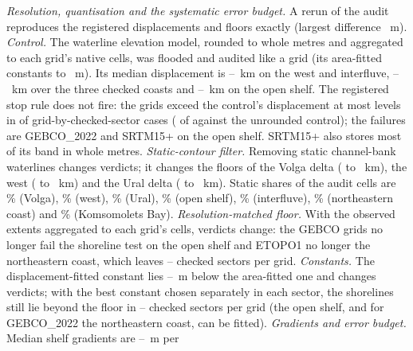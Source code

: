\emph{Resolution, quantisation and the systematic error budget.} A rerun of the audit reproduces the registered displacements and floors exactly (largest difference ~m). \emph{Control.} The waterline elevation model, rounded to whole metres and aggregated to each grid's native cells, was flooded and audited like a grid (its area-fitted constants  to ~m). Its median displacement is --~km on the west and interfluve, --~km over the three checked coasts and --~km on the open shelf. The registered stop rule does not fire: the grids exceed the control's displacement at most levels in  of  grid-by-checked-sector cases ( of  against the unrounded control); the  failures are GEBCO\_2022 and SRTM15+ on the open shelf. SRTM15+ also stores most of its band in whole metres. \emph{Static-contour filter.} Removing static channel-bank waterlines changes  verdicts; it changes the floors of the Volga delta ( to ~km), the west ( to ~km) and the Ural delta ( to ~km). Static shares of the audit cells are \% (Volga), \% (west), \% (Ural), \% (open shelf), \% (interfluve), \% (northeastern coast) and \% (Komsomolets Bay). \emph{Resolution-matched floor.} With the observed extents aggregated to each grid's cells,  verdicts change: the GEBCO grids no longer fail the shoreline test on the open shelf and ETOPO1 no longer the northeastern coast, which leaves -- checked sectors per grid. \emph{Constants.} The displacement-fitted constant lies --~m below the area-fitted one and changes  verdicts; with the best constant chosen separately in each sector, the shorelines still lie beyond the floor in -- checked sectors per grid (the open shelf, and for GEBCO\_2022 the northeastern coast, can be fitted). \emph{Gradients and error budget.} Median shelf gradients are --~m per 